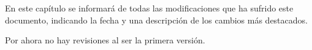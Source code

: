 En este capítulo se informará de todas las modificaciones que ha sufrido este documento, indicando la fecha y una descripción de los cambios más destacados.

Por ahora no hay revisiones al ser la primera versión.